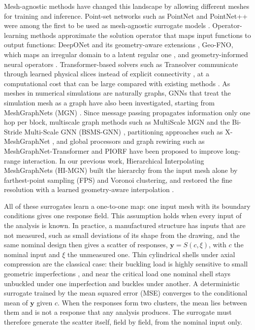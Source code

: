 \documentclass[preprint,12pt]{elsarticle}
\newcommand{\by}{\mathbf{y}}
\begin{document}
Mesh-agnostic methods have changed this landscape by allowing different meshes for training and
inference. Point-set networks such as PointNet and PointNet++ were among the first to be used as
mesh-agnostic surrogate models \cite{qi2017pointnet,qi2017pointnet++}. Operator-learning methods
approximate the solution operator that maps input functions to output functions: DeepONet and
its geometry-aware extensions \cite{lu2021learning,he2024geom}, Geo-FNO, which maps an irregular
domain to a latent regular one \cite{li2023fourier}, and geometry-informed neural operators
\cite{li2023geometry}. Transformer-based solvers such as Transolver communicate through learned
physical slices instead of explicit connectivity \cite{wu2024transolver}, at a computational cost
that can be large compared with existing methods \cite{alkin2025ab}. As meshes in numerical
simulations are naturally graphs, GNNs that treat the simulation mesh as a graph have also been
investigated, starting from MeshGraphNets (MGN) \cite{pfaff2021mesh}. Since message passing
propagates information only one hop per block, multiscale graph methods such as MultiScale MGN
and the Bi-Stride Multi-Scale GNN (BSMS-GNN) \cite{fortunato2022multiscale,cao2023efficient},
partitioning approaches such as X-MeshGraphNet \cite{nabian2024x}, and global processors and
graph rewiring such as MeshGraphNet-Transformer and PIORF
\cite{iparraguirre2026meshgraphnet,yu2025piorf} have been proposed to improve long-range
interaction. In our previous work, Hierarchical Interpolating MeshGraphNets (HI-MGN) built the
hierarchy from the input mesh alone by farthest-point sampling (FPS) and Voronoi clustering, and
restored the fine resolution with a learned geometry-aware interpolation \cite{lee2026himgn}.

All of these surrogates learn a one-to-one map: one input mesh with its boundary conditions gives
one response field. This assumption holds when every input of the analysis is known. In practice,
a manufactured structure has inputs that are not measured, such as small deviations of its shape
from the drawing, and the same nominal design then gives a scatter of responses, $\by=S(c,\xi)$,
with $c$ the nominal input and $\xi$ the unmeasured one. Thin cylindrical shells under axial
compression are the classical case: their buckling load is highly sensitive to small geometric
imperfections \cite{hutchinson1970postbuckling}, and near the critical load one nominal shell
stays unbuckled under one imperfection and buckles under another. A deterministic surrogate
trained by the mean squared error (MSE) converges to the conditional mean of $\by$ given $c$.
When the responses form two clusters, the mean lies between them and is not a response that any
analysis produces. The surrogate must therefore generate the scatter itself, field by field,
from the nominal input only.
\end{document}
